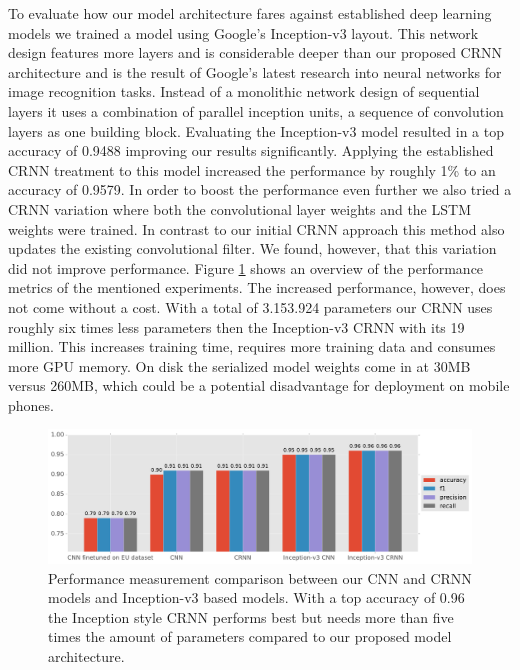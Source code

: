 To evaluate how our model architecture fares against established deep learning models we trained a model using Google's Inception-v3\cite{szegedy2016rethinking} layout. This network design features more layers and is considerable deeper than our proposed CRNN architecture and is the result of Google's latest research into neural networks for image recognition tasks. Instead of a monolithic network design of sequential layers it uses a combination of parallel inception units, a sequence of convolution layers as one building block. Evaluating the Inception-v3 model resulted in a top accuracy of 0.9488 improving our results significantly. Applying the established CRNN treatment to this model increased the performance by roughly 1\% to an accuracy of 0.9579. In order to boost the performance even further we also tried a CRNN variation where both the convolutional layer weights and the LSTM weights were trained. In contrast to our initial CRNN approach this method also updates the existing convolutional filter. We found, however, that this variation did not improve performance.
Figure \ref{fig:news_results} shows an overview of the performance metrics of the mentioned experiments.
The increased performance, however, does not come without a cost. With a total of 3.153.924 parameters our CRNN uses roughly six times less parameters then the Inception-v3 CRNN with its 19 million. This increases training time, requires more training data and consumes more GPU memory. On disk the serialized model weights come in at 30MB versus 260MB, which could be a potential disadvantage for deployment on mobile phones.

	\begin{figure}[]
  		\centering
    	\includegraphics[width=\textwidth, keepaspectratio]{plots/results_news_plot.pdf}
    	\caption{Performance measurement comparison between our CNN and CRNN models and Inception-v3 based models. With a top accuracy of 0.96 the Inception style CRNN performs best but needs more than five times the amount of parameters compared to our proposed model architecture.}
    	\label{fig:news_results}
	\end{figure}


